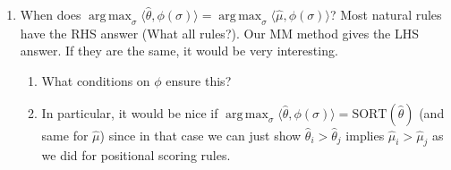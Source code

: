 \documentclass[10pt,letterpaper]{article}
\newcommand{\sort}{\text{SORT}}
\newcommand{\muhat}{\hat{\mu}}
\newcommand{\that}{\hat{\theta}}
\DeclareMathOperator*{\argmax}{arg\,max}
\begin{document}
\begin{enumerate}
\item When does $\argmax_{\sigma} \langle \that, \phi(\sigma) \rangle = \argmax_{\sigma} \langle \muhat, \phi(\sigma) \rangle$? Most natural rules have the RHS answer (What all rules?). Our MM method gives the LHS answer. If they are the same, it would be very interesting. 
\begin{enumerate}
\item What conditions on $\phi$ ensure this? 
\item In particular, it would be nice if $\argmax_{\sigma} \langle \that, \phi(\sigma) \rangle = \sort(\that)$ (and same for $\muhat$) since in that case we can just show $\that_i > \that_j$ implies $\muhat_i > \muhat_j$ as we did for positional scoring rules.
\end{enumerate}
\end{enumerate}
\end{document}
